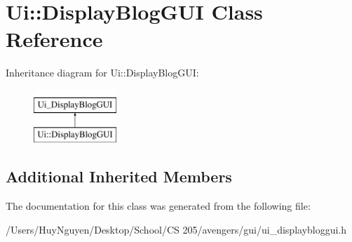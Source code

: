 \hypertarget{classUi_1_1DisplayBlogGUI}{}\section{Ui\+:\+:Display\+Blog\+G\+UI Class Reference}
\label{classUi_1_1DisplayBlogGUI}
Inheritance diagram for Ui\+:\+:Display\+Blog\+G\+UI\+:\begin{figure}[H]
\begin{center}
\leavevmode
\includegraphics[height=2.000000cm]{classUi_1_1DisplayBlogGUI}
\end{center}
\end{figure}
\subsection*{Additional Inherited Members}


The documentation for this class was generated from the following file\+:\begin{DoxyCompactItemize}
\item 
/\+Users/\+Huy\+Nguyen/\+Desktop/\+School/\+C\+S 205/avengers/gui/ui\+\_\+displaybloggui.\+h\end{DoxyCompactItemize}
